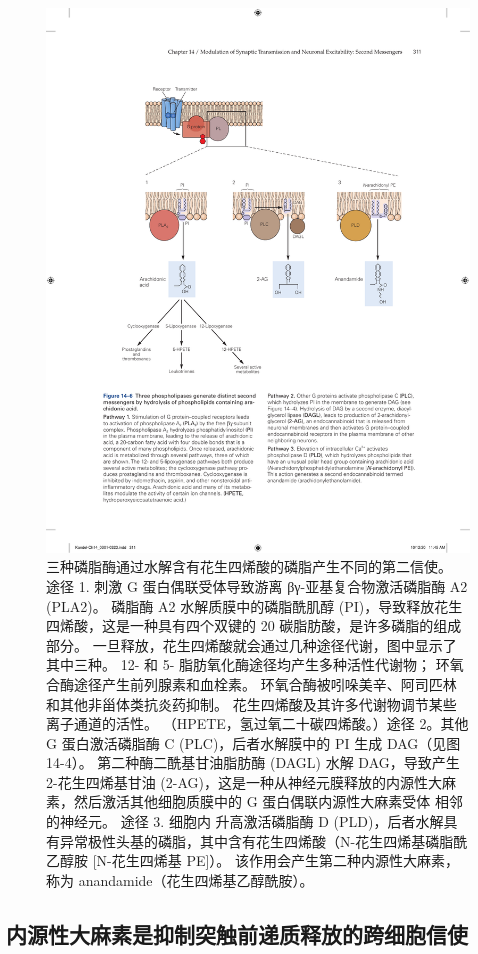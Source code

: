 \begin{figure}[htbp]
	\centering
	\includegraphics[width=0.8\linewidth]{chap14/fig_14_6}
	\caption{三种磷脂酶通过水解含有花生四烯酸的磷脂产生不同的第二信使。 途径 1. 刺激 G 蛋白偶联受体导致游离 βγ-亚基复合物激活磷脂酶 A2 (PLA2)。 磷脂酶 A2 水解质膜中的磷脂酰肌醇 (PI)，导致释放花生四烯酸，这是一种具有四个双键的 20 碳脂肪酸，是许多磷脂的组成部分。 一旦释放，花生四烯酸就会通过几种途径代谢，图中显示了其中三种。 12- 和 5- 脂肪氧化酶途径均产生多种活性代谢物； 环氧合酶途径产生前列腺素和血栓素。 环氧合酶被吲哚美辛、阿司匹林和其他非甾体类抗炎药抑制。 花生四烯酸及其许多代谢物调节某些离子通道的活性。 （HPETE，氢过氧二十碳四烯酸。）途径 2。其他 G 蛋白激活磷脂酶 C (PLC)，后者水解膜中的 PI 生成 DAG（见图 14-4）。 第二种酶二酰基甘油脂肪酶 (DAGL) 水解 DAG，导致产生 2-花生四烯基甘油 (2-AG)，这是一种从神经元膜释放的内源性大麻素，然后激活其他细胞质膜中的 G 蛋白偶联内源性大麻素受体 相邻的神经元。 途径 3. 细胞内  升高激活磷脂酶 D (PLD)，后者水解具有异常极性头基的磷脂，其中含有花生四烯酸（N-花生四烯基磷脂酰乙醇胺 [N-花生四烯基 PE]）。 该作用会产生第二种内源性大麻素，称为 anandamide（花生四烯基乙醇酰胺）。}
	\label{fig:14_6}
\end{figure}



\subsection{内源性大麻素是抑制突触前递质释放的跨细胞信使}

